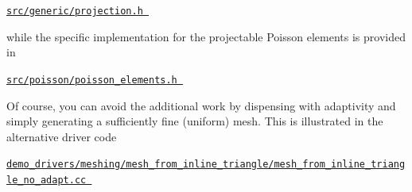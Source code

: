 \begin{center} \href{../../../../src/generic/projection.h}{\tt src/generic/projection.\+h } \end{center} 

while the specific implementation for the projectable Poisson elements is provided in

\begin{center} \href{../../../../src/poisson/poisson_elements.h}{\tt src/poisson/poisson\+\_\+elements.\+h } \end{center} 

Of course, you can avoid the additional work by dispensing with adaptivity and simply generating a sufficiently fine (uniform) mesh. This is illustrated in the alternative driver code \begin{center} \href{../../../../demo_drivers/meshing/mesh_from_inline_triangle/mesh_from_inline_triangle_no_adapt.cc}{\tt demo\+\_\+drivers/meshing/mesh\+\_\+from\+\_\+inline\+\_\+triangle/mesh\+\_\+from\+\_\+inline\+\_\+triangle\+\_\+no\+\_\+adapt.\+cc } \end{center} 



